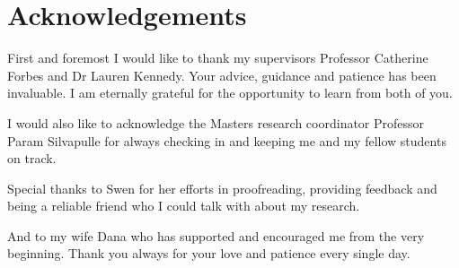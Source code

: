 \documentclass[12pt, a4paper]{article}
\begin{document}
\begin{abstract}
\end{abstract}

\newpage

\section*{Acknowledgements}
First and foremost I would like to thank my supervisors Professor Catherine Forbes and Dr Lauren Kennedy. Your advice, guidance and patience has been invaluable. I am eternally grateful for the opportunity to learn from both of you.

I would also like to acknowledge the Masters research coordinator Professor Param Silvapulle for always checking in and keeping me and my fellow students on track.

Special thanks to Swen for her efforts in proofreading, providing feedback and being a reliable friend who I could talk with about my research.

And to my wife Dana who has supported and encouraged me from the very beginning. Thank you always for your love and patience every single day.

\newpage

\tableofcontents{\protect\newpage}
\end{document}
